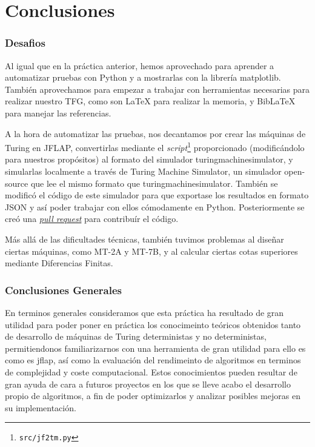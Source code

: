 \part{Conclusiones}

\section{Desafios}
Al igual que en la práctica anterior, hemos aprovechado para aprender a automatizar pruebas con Python y a mostrarlas con la librería matplotlib\parencite{matplotlib}. También aprovechamos para empezar a trabajar con herramientas necesarias para realizar nuestro TFG, como son \LaTeX\parencite{latex} para realizar la memoria, y BibLaTeX\parencite{biblatex} para manejar las referencias.\medskip

A la hora de automatizar las pruebas, nos decantamos por crear las máquinas de Turing en JFLAP\parencite{jflap}, convertirlas mediante el \textit{script}\footnote{\texttt{src/jf2tm.py}} proporcionado (modificándolo para nuestros propósitos) al formato del simulador turingmachinesimulator\parencite{turingmachinesimulator}, y simularlas localmente a través de Turing Machine Simulator\parencite{tmsimulator}, un simulador open-source que lee el mismo formato que turingmachinesimulator. También se modificó el código de este simulador para que exportase los resultados en formato JSON\parencite{json} y así poder trabajar con ellos cómodamente en Python. Posteriormente se creó una \href{https://github.com/fcortes/turing-machine-simulator/pull/2}{\textit{pull request}} para contribuír el código.\medskip

Más allá de las dificultades técnicas, también tuvimos problemas al diseñar ciertas máquinas, como MT-2A y MT-7B, y al calcular ciertas cotas superiores mediante Diferencias Finitas.


\section{Conclusiones Generales}

En terminos generales consideramos que esta práctica ha resultado de gran utilidad para poder poner en práctica los conocimeinto teóricos obtenidos tanto de desarrollo de máquinas de Turing deterministas y no deterministas, permitiendonos familiarizarnos con una herramienta de gran utilidad para ello es como es jflap, así como la evaluación del rendimeinto de algoritmos en terminos de complejidad y coste computacional.
Estos conocimientos pueden resultar de gran ayuda de cara a futuros proyectos en los que se lleve acabo el desarrollo propio de algoritmos, a fin de poder optimizarlos y analizar posibles mejoras en su implementación.  

\newpage